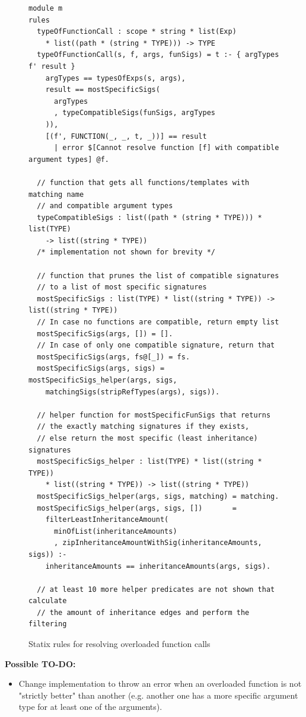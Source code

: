     \begin{figure}
      \begin{verbatim}
module m
rules
  typeOfFunctionCall : scope * string * list(Exp) 
    * list((path * (string * TYPE))) -> TYPE
  typeOfFunctionCall(s, f, args, funSigs) = t :- { argTypes f' result }
    argTypes == typesOfExps(s, args),
    result == mostSpecificSigs(
      argTypes
      , typeCompatibleSigs(funSigs, argTypes
    )),
    [(f', FUNCTION(_, _, t, _))] == result
      | error $[Cannot resolve function [f] with compatible argument types] @f.

  // function that gets all functions/templates with matching name
  // and compatible argument types
  typeCompatibleSigs : list((path * (string * TYPE))) * list(TYPE)
    -> list((string * TYPE))
  /* implementation not shown for brevity */
    
  // function that prunes the list of compatible signatures
  // to a list of most specific signatures
  mostSpecificSigs : list(TYPE) * list((string * TYPE)) -> list((string * TYPE))
  // In case no functions are compatible, return empty list
  mostSpecificSigs(args, []) = [].
  // In case of only one compatible signature, return that
  mostSpecificSigs(args, fs@[_]) = fs.
  mostSpecificSigs(args, sigs) = mostSpecificSigs_helper(args, sigs, 
    matchingSigs(stripRefTypes(args), sigs)).

  // helper function for mostSpecificFunSigs that returns
  // the exactly matching signatures if they exists,
  // else return the most specific (least inheritance) signatures
  mostSpecificSigs_helper : list(TYPE) * list((string * TYPE))
    * list((string * TYPE)) -> list((string * TYPE))
  mostSpecificSigs_helper(args, sigs, matching) = matching.
  mostSpecificSigs_helper(args, sigs, [])       = 
    filterLeastInheritanceAmount(
      minOfList(inheritanceAmounts) 
      , zipInheritanceAmountWithSig(inheritanceAmounts, sigs)) :-
    inheritanceAmounts == inheritanceAmounts(args, sigs).
  
  // at least 10 more helper predicates are not shown that calculate
  // the amount of inheritance edges and perform the filtering
      \end{verbatim}
      \caption{\label{fig:statix-overloaded-function-calls}Statix rules for resolving overloaded function calls}
    \end{figure}

    \textbf{Possible TO-DO:}
    \begin{itemize}
      \item Change implementation to throw an error when an overloaded function is not "strictly better" than another (e.g. another one has a more specific argument type for at least one of the arguments).
    \end{itemize}

